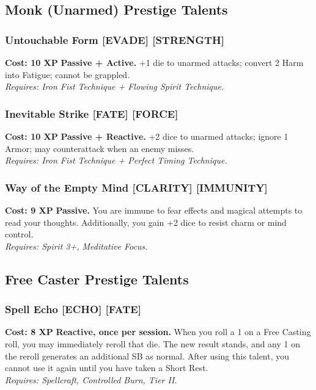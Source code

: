 \documentclass[12pt,a4paper]{book}
\begin{document}
\subsection*{Monk (Unarmed) Prestige Talents}
\label{sec:prestige-monk}

\subsubsection*{Untouchable Form \textnormal{[EVADE] [STRENGTH]}}
\label{talent:untouchable-form}
\textbf{Cost: 10 XP} \textbf{Passive + Active.} +1 die to unarmed attacks; convert 2 Harm into Fatigue; cannot be grappled. \\
\textit{Requires: Iron Fist Technique + Flowing Spirit Technique.}

\subsubsection*{Inevitable Strike \textnormal{[FATE] [FORCE]}}
\label{talent:inevitable-strike}
\textbf{Cost: 10 XP} \textbf{Passive + Reactive.} +2 dice to unarmed attacks; ignore 1 Armor; may counterattack when an enemy misses. \\
\textit{Requires: Iron Fist Technique + Perfect Timing Technique.}

\subsubsection*{Way of the Empty Mind \textnormal{[CLARITY] [IMMUNITY]}}
\label{talent:way-of-the-empty-mind}
\textbf{Cost: 9 XP} \textbf{Passive.} You are immune to fear effects and magical attempts to read your thoughts. Additionally, you gain +2 dice to resist charm or mind control. \\
\textit{Requires: Spirit 3+, Meditative Focus.}

\subsection*{Free Caster Prestige Talents}
\label{sec:prestige-freecaster}

\subsubsection*{Spell Echo \textnormal{[ECHO] [FATE]}}
\label{talent:spell-echo}
\textbf{Cost: 8 XP} \textbf{Reactive, once per session.} When you roll a 1 on a Free Casting roll, you may immediately reroll that die. The new result stands, and any 1 on the reroll generates an additional SB as normal. After using this talent, you cannot use it again until you have taken a Short Rest. \\
\textit{Requires: Spellcraft, Controlled Burn, Tier II.}
\end{document}

